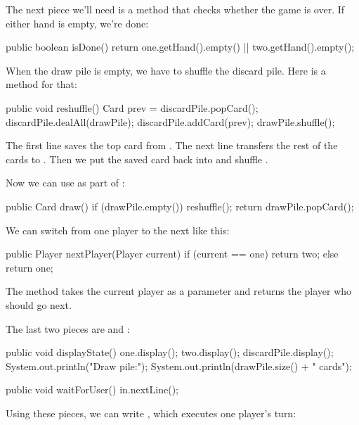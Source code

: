 The next piece we'll need is a method that checks whether the game is over.
If either hand is empty, we're done:

\begin{code}
public boolean isDone() {
    return one.getHand().empty() || two.getHand().empty();
}
\end{code}

When the draw pile is empty, we have to shuffle the discard pile.
Here is a method for that:

\begin{code}
public void reshuffle() {
    Card prev = discardPile.popCard();
    discardPile.dealAll(drawPile);
    discardPile.addCard(prev);
    drawPile.shuffle();
}
\end{code}

The first line saves the top card from .
The next line transfers the rest of the cards to .
Then we put the saved card back into  and shuffle .

Now we can use  as part of :

\begin{code}
public Card draw() {
    if (drawPile.empty()) {
        reshuffle();
    }
    return drawPile.popCard();
}
\end{code}

We can switch from one player to the next like this:

\begin{code}
public Player nextPlayer(Player current) {
    if (current == one) {
        return two;
    } else {
        return one;
    }
}
\end{code}

The  method takes the current player as a parameter and returns the player who should go next.

The last two pieces are  and :

\begin{code}
public void displayState() {
    one.display();
    two.display();
    discardPile.display();
    System.out.println("Draw pile:");
    System.out.println(drawPile.size() + " cards");
}
\end{code}

\begin{code}
public void waitForUser() {
    in.nextLine();
}
\end{code}

Using these pieces, we can write , which executes one player's turn:


